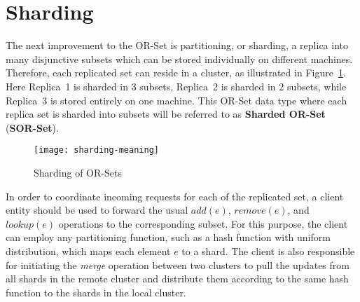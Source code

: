 \section{Sharding}
\label{sec:sharding}

The next improvement to the OR-Set is partitioning, or sharding, a replica into
many disjunctive subsets which can be stored individually on different machines.
Therefore, each replicated set can reside in a cluster, as illustrated in
Figure~\ref{fig:sharding_meaning}. Here Replica~1 is sharded in 3 subsets,
Replica~2 is sharded in 2 subsets, while Replica~3 is stored entirely on one
machine. This OR-Set data type where each replica set is sharded into subsets
will be referred to as \textbf{Sharded OR-Set} (\textbf{SOR-Set}).

\begin{figure}[b]
  \centering
  \texttt{[image: sharding-meaning]}
  \caption{Sharding of OR-Sets}
  \label{fig:sharding_meaning}
\end{figure}

In order to coordinate incoming requests for each of the replicated set, a
client entity should be used to forward the usual $\textit{add}(e)$,
$\textit{remove}(e)$, and $\textit{lookup}(e)$ operations to the corresponding
subset. For this purpose, the client can employ any partitioning function, such
as a hash function with uniform distribution, which maps each element $e$ to a
shard. The client is also responsible for initiating the \textit{merge}
operation between two clusters to pull the updates from all shards in the remote
cluster and distribute them according to the same hash function to the shards in
the local cluster.

